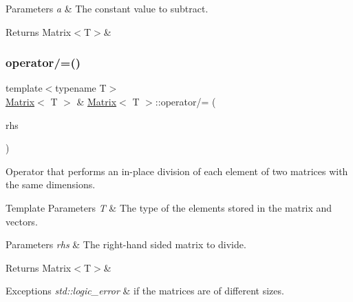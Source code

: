 \begin{DoxyParams}{Parameters}
{\em a} & The constant value to subtract. \\
\hline
\end{DoxyParams}
\begin{DoxyReturn}{Returns}
Matrix$<$\+T$>$\& 
\end{DoxyReturn}
\mbox{\label{classMatrix_aab1b305350c7547ee31f0eeb92fc8c4a}} 
\subsubsection{\texorpdfstring{operator/=()}{operator/=()}\hspace{0.1cm}{\footnotesize\ttfamily [1/2]}}
{\footnotesize\ttfamily template$<$typename T$>$ \\
\mbox{\hyperlink{classMatrix}{Matrix}}$<$ T $>$ \& \mbox{\hyperlink{classMatrix}{Matrix}}$<$ T $>$\+::operator/= (\begin{DoxyParamCaption}\item[{const \mbox{\hyperlink{classMatrix}{Matrix}}$<$ T $>$ \&}]{rhs }\end{DoxyParamCaption})\hspace{0.3cm}{\ttfamily [inline]}}



Operator that performs an in-\/place division of each element of two matrices with the same dimensions. 


\begin{DoxyTemplParams}{Template Parameters}
{\em T} & The type of the elements stored in the matrix and vectors. \\
\hline
\end{DoxyTemplParams}

\begin{DoxyParams}{Parameters}
{\em rhs} & The right-\/hand sided matrix to divide. \\
\hline
\end{DoxyParams}
\begin{DoxyReturn}{Returns}
Matrix$<$\+T$>$\&
\end{DoxyReturn}

\begin{DoxyExceptions}{Exceptions}
{\em std\+::logic\+\_\+error} & if the matrices are of different sizes. \\
\hline
\end{DoxyExceptions}
\mbox{\label{classMatrix_ada3039797826038262e03da2ee3a8697}} 
